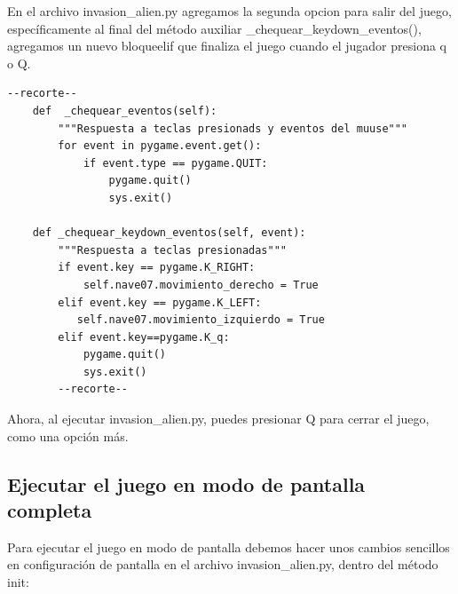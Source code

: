 En  el  archivo {\ttfamily invasion\_alien.py} agregamos la segunda opcion para salir del juego, específicamente al final del
método auxiliar {\ttfamily \_chequear\_keydown\_eventos()}, agregamos un nuevo bloque{\ttfamily elif} que finaliza el juego 
cuando el jugador presiona {\ttfamily q} o  {\ttfamily Q}. 

\hspace{-2.4cm}{\ttfamily \scriptsize invasión}

\vspace{-0.2cm}
\hspace{-2.1cm}{\ttfamily \scriptsize \_alien.py}\vspace{-0.84cm}
\begin{lstlisting}
--recorte--    
    def  _chequear_eventos(self):
        """Respuesta a teclas presionads y eventos del muuse"""
        for event in pygame.event.get():
            if event.type == pygame.QUIT:
                pygame.quit()
                sys.exit()

    def _chequear_keydown_eventos(self, event):
        """Respuesta a teclas presionadas"""
        if event.key == pygame.K_RIGHT:
            self.nave07.movimiento_derecho = True              
        elif event.key == pygame.K_LEFT:
           self.nave07.movimiento_izquierdo = True 
        elif event.key==pygame.K_q:
            pygame.quit()
            sys.exit()
        --recorte-- 
\end{lstlisting}
	
Ahora, al ejecutar {\ttfamily invasion\_alien.py},  puedes presionar Q para cerrar el juego, como una opción más.

\subsection{Ejecutar el juego en modo de pantalla completa}

Para ejecutar el juego en modo de pantalla debemos hacer unos cambios sencillos en configuración de pantalla en el archivo {\ttfamily invasion\_alien.py}, dentro del método {\ttfamily init}:


\hspace{-2.4cm}{\ttfamily \scriptsize invasión}

